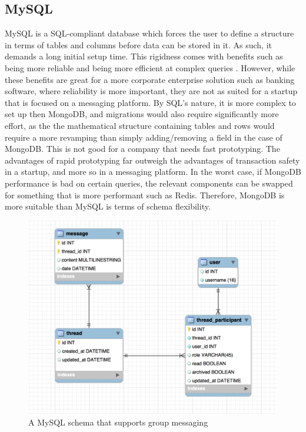 \documentclass[12pt]{article}
\begin{document}
\subsection{MySQL}
MySQL is a SQL-compliant database which forces the user to define a structure in terms of tables and columns before data can be stored in it. As such, it demands a long initial setup time. This rigidness comes with benefits such as being more reliable and being more efficient at complex queries \cite{sql_vs_nosql}. However, while these benefits are great for a more corporate enterprise solution such as banking software, where reliability is more important, they are not as suited for a startup that is focused on a messaging platform. By SQL's nature, it is more complex to set up then MongoDB, and migrations would also require significantly more effort, as the the mathematical structure containing tables and rows would require a more revamping than simply adding/removing a field in the case of MongoDB. This is not good for a company that needs fast prototyping. The advantages of rapid prototyping far outweigh the advantages of transaction safety in a startup, and more so in a messaging platform. In the worst case, if MongoDB performance is bad on certain queries, the relevant components can be swapped for something that is more performant such as Redis. Therefore, MongoDB is more suitable than MySQL is terms of schema flexibility.

\begin{figure}
\begin{center}
        \includegraphics[scale=0.8]{resources/mysql_schema.png}
\end{center}
\caption{\label{figcaption} A MySQL schema that supports group messaging \cite{cap_picture}}
\end{figure}
\end{document}
